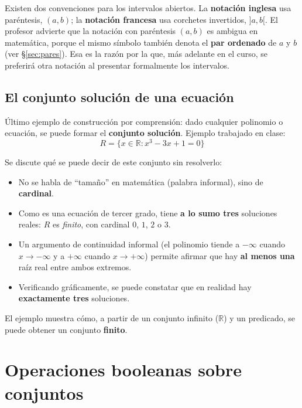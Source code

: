 \documentclass[12pt,a4paper]{article}
\begin{document}
\begin{notebox}
Existen dos convenciones para los intervalos abiertos. La \textbf{notación inglesa} usa paréntesis, $(a,b)$; la \textbf{notación francesa} usa corchetes invertidos, $]a,b[$. El profesor advierte que la notación con paréntesis $(a,b)$ es ambigua en matemática, porque el mismo símbolo también denota el \textbf{par ordenado} de $a$ y $b$ (ver §\ref{sec:pares}). Esa es la razón por la que, más adelante en el curso, se preferirá otra notación al presentar formalmente los intervalos.
\end{notebox}

\subsection{El conjunto solución de una ecuación}

Último ejemplo de construcción por comprensión: dado cualquier polinomio o ecuación, se puede formar el \textbf{conjunto solución}. Ejemplo trabajado en clase:
$$R = \{x \in \mathbb R : x^3 - 3x + 1 = 0\}$$

Se discute qué se puede decir de este conjunto sin resolverlo:
\begin{itemize}
  \item No se habla de ``tamaño'' en matemática (palabra informal), sino de \textbf{cardinal}.
  \item Como es una ecuación de tercer grado, tiene \textbf{a lo sumo tres} soluciones reales: $R$ es \emph{finito}, con cardinal $0$, $1$, $2$ o $3$.
  \item Un argumento de continuidad informal (el polinomio tiende a $-\infty$ cuando $x \to -\infty$ y a $+\infty$ cuando $x \to +\infty$) permite afirmar que hay \textbf{al menos una} raíz real entre ambos extremos.
  \item Verificando gráficamente, se puede constatar que en realidad hay \textbf{exactamente tres} soluciones.
\end{itemize}

\begin{notebox}
El ejemplo muestra cómo, a partir de un conjunto infinito ($\mathbb R$) y un predicado, se puede obtener un conjunto \textbf{finito}.
\end{notebox}

\section{Operaciones booleanas sobre conjuntos}
\label{sec:booleanas}
\end{document}
